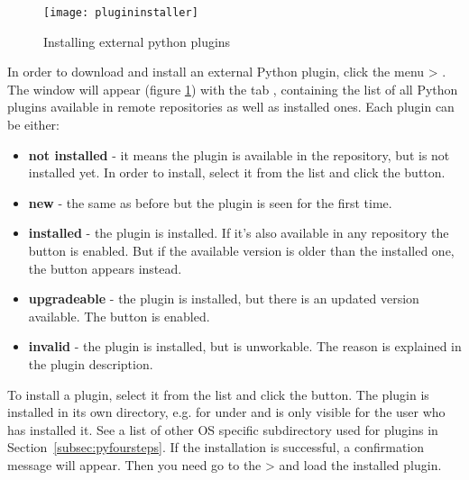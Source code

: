 \begin{figure}[ht]
   \begin{center}
   \caption{Installing external python plugins \nixcaption}
\label{fig:plugininstaller}\smallskip
   \texttt{[image: plugininstaller]}
\end{center}
\end{figure}

In order to download and install an external Python plugin, click the menu  > .
The  window will appear (figure \ref{fig:plugininstaller}) with the tab , containing the list of all Python plugins available in remote repositories as well as installed ones. Each plugin can be either:
\begin{itemize}
\item \textbf{not installed} - it means the plugin is available in the repository, but is not installed yet. In order to install, select it from the list and click the  button.
\item \textbf{new} - the same as before but the plugin is seen for the first time.
\item \textbf{installed} - the plugin is installed. If it's also available in any repository the  button is enabled. But if the available version is older than the installed one, the  button appears instead.
\item \textbf{upgradeable} - the plugin is installed, but there is an updated version available. The  button is enabled.
\item \textbf{invalid} - the plugin is installed, but is unworkable. The reason is explained in the plugin description.
\end{itemize}


To install a plugin, select it from the list and click the  button. The plugin is installed in its own directory, e.g. for \nix under  and is only visible for the user who has installed it. See a list of other OS specific subdirectory used for plugins in Section~\ref{subsec:pyfoursteps}. If the installation is successful, a confirmation message will appear. Then you need go to the  >  and load the installed plugin. 

